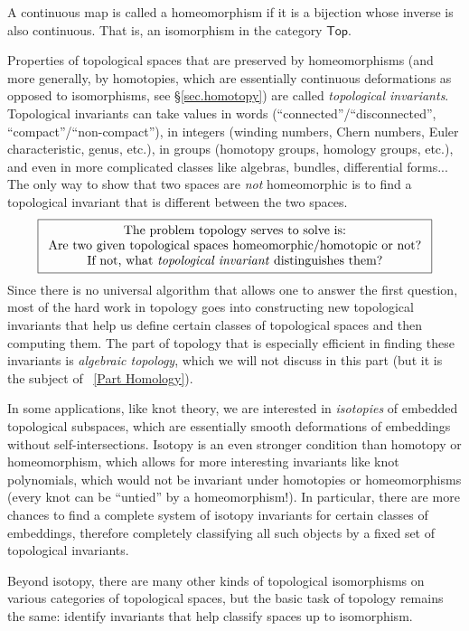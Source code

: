 \begin{defn}[Homeomorphism]
    A continuous map is called a homeomorphism if it is a bijection whose inverse is also continuous. That is, an isomorphism in the category $\mathsf{Top}$.
\end{defn}

Properties of topological spaces that are preserved by homeomorphisms (and more generally, by homotopies, which are essentially continuous deformations as opposed to isomorphisms, see \S\ref{sec.homotopy}) are called \emph{topological invariants}. Topological invariants can take values in words (``connected''/``disconnected'', ``compact''/``non-compact''), in integers (winding numbers, Chern numbers, Euler characteristic, genus, etc.), in groups (homotopy groups, homology groups, etc.), and even in more complicated classes like algebras, bundles, differential forms... The only way to show that two spaces are \emph{not} homeomorphic is to find a topological invariant that is different between the two spaces.
\begin{gather*}
    \boxed{\begin{array}{c}
    \text{The problem topology serves to solve is:}\\
    \text{Are two given topological spaces homeomorphic/homotopic or not?}\\
    \text{If not, what \emph{topological invariant} distinguishes them?}
    \end{array}}
\end{gather*}
Since there is no universal algorithm that allows one to answer the first question, most of the hard work in topology goes into constructing new topological invariants that help us define certain classes of topological spaces and then computing them. The part of topology that is especially efficient in finding these invariants is \emph{algebraic topology}, which we will not discuss in this part (but it is the subject of \Part~\ref{Part Homology}).

\begin{rem}
    In some applications, like knot theory, we are interested in \emph{isotopies} of embedded topological subspaces, which are essentially smooth deformations of embeddings without self-intersections. Isotopy is an even stronger condition than homotopy or homeomorphism, which allows for more interesting invariants like knot polynomials, which would not be invariant under homotopies or homeomorphisms (every knot can be ``untied'' by a homeomorphism!). In particular, there are more chances to find a complete system of isotopy invariants for certain classes of embeddings, therefore completely classifying all such objects by a fixed set of topological invariants. 
    
    Beyond isotopy, there are many other kinds of topological isomorphisms on various categories of topological spaces, but the basic task of topology remains the same: identify invariants that help classify spaces up to isomorphism.
\end{rem}



